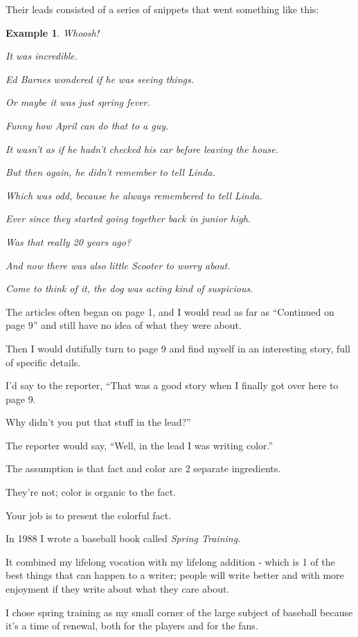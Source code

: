 \documentclass{book}
\numberwithin{equation}{section}
\newtheorem{example}{Example}[chapter]
\begin{document}
Their leads consisted of a series of snippets that went something like this:
\begin{example}
    Whoosh!
    
    It was incredible.
    
    Ed Barnes wondered if he was seeing things.
    
    Or maybe it was just spring fever.
    
    Funny how April can do that to a guy.
    
    It wasn't as if he hadn't checked his car before leaving the house.
    
    But then again, he didn't remember to tell Linda.
    
    Which was odd, because he always remembered to tell Linda.
    
    Ever since they started going together back in junior high.
    
    Was that really 20 years ago?
    
    And now there was also little Scooter to worry about.
    
    Come to think of it, the dog was acting kind of suspicious.
\end{example}
The articles often began on page 1, and I would read as far as ``Continued on page 9'' and still have no idea of what they were about.

Then I would dutifully turn to page 9 and find myself in an interesting story, full of specific details.

I'd say to the reporter, ``That was a good story when I finally got over here to page 9.

Why didn't you put that stuff in the lead?''

The reporter would say, ``Well, in the lead I was writing color.''

The assumption is that fact and color are 2 separate ingredients.

They're not; color is organic to the fact.

Your job is to present the colorful fact.

In 1988 I wrote a baseball book called \textit{Spring Training}.

It combined my lifelong vocation with my lifelong addition - which is 1 of the best things that can happen to a writer; people will write better and with more enjoyment if they write about what they care about.

I chose spring training as my small corner of the large subject of baseball because it's a time of renewal, both for the players and for the fans.
\end{document}
